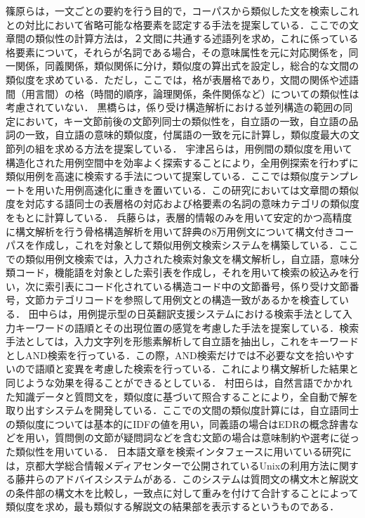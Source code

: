 篠原\cite{sinohara}らは，一文ごとの要約を行う目的で，コーパスから類似した文を検索しこれとの対比において省略可能な格要素を認定する手法を提案している．ここでの文章間の類似性の計算方法は，２文間に共通する述語列を求め，これに係っている格要素について，それらが名詞である場合，その意味属性を元に対応関係を，同一関係，同義関係，類似関係に分け，類似度の算出式を設定し，総合的な文間の類似度を求めている．ただし，ここでは，格が表層格であり，文間の関係や述語間（用言間）の格（時間的順序，論理関係，条件関係など）についての類似性は考慮されていない．
黒橋ら\cite{kurohashi}は，係り受け構造解析における並列構造の範囲の同定において，キー文節前後の文節列同士の類似性を，自立語の一致，自立語の品詞の一致，自立語の意味的類似度，付属語の一致を元に計算し，類似度最大の文節列の組を求める方法を提案している．
宇津呂ら\cite{uturo}は，用例間の類似度を用いて構造化された用例空間中を効率よく探索することにより，全用例探索を行わずに類似用例を高速に検索する手法について提案している．ここでは類似度テンプレートを用いた用例高速化に重きを置いている．この研究においては文章間の類似度を対応する語同士の表層格の対応および格要素の名詞の意味カテゴリの類似度をもとに計算している．
兵藤ら\cite{hyoudo}は，表層的情報のみを用いて安定的かつ高精度に構文解析を行う骨格構造解析を用いて辞典の8万用例文について構文付きコーパスを作成し，これを対象として類似用例文検索システムを構築している．ここでの類似用例文検索では，入力された検索対象文を構文解析し，自立語，意味分類コード，機能語を対象とした索引表を作成し，それを用いて検索の絞込みを行い，次に索引表にコード化されている構造コード中の文節番号，係り受け文節番号，文節カテゴリコードを参照して用例文との構造一致があるかを検査している．
田中ら\cite{tanaka}は，用例提示型の日英翻訳支援システムにおける検索手法として入力キーワードの語順とその出現位置の感覚を考慮した手法を提案している．検索手法としては，入力文字列を形態素解析して自立語を抽出し，これをキーワードとしAND検索を行っている．この際，AND検索だけでは不必要な文を拾いやすいので語順と変異を考慮した検索を行っている．これにより構文解析した結果と同じような効果を得ることができるとしている．
村田ら\cite{murata}は，自然言語でかかれた知識データと質問文を，類似度に基づいて照合することにより，全自動で解を取り出すシステムを開発している．ここでの文間の類似度計算には，自立語同士の類似度については基本的にIDFの値を用い，同義語の場合はEDRの概念辞書などを用い，質問側の文節が疑問詞などを含む文節の場合は意味制約や選考に従った類似性を用いている．
日本語文章を検索インタフェースに用いている研究には，京都大学総合情報メディアセンターで公開されているUnixの利用方法に関する藤井ら\cite{kyoudai}のアドバイスシステムがある．このシステムは質問文の構文木と解説文の条件部の構文木を比較し，一致点に対して重みを付けて合計することによって類似度を求め，最も類似する解説文の結果部を表示するというものである．


